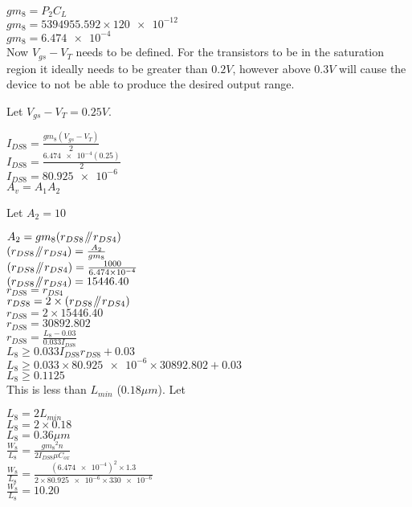$gm_{8} = P_{2}C_{L}$ \\
$gm_{8} = 5394955.592 \times \num{120e-12}$ \\
$gm_{8} = \num{6.474e-4}$ \\

Now $V_{gs} - V_{T}$ needs to be defined.
For the transistors to be in the saturation region it ideally needs to be greater than $0.2V$, however above $0.3V$ will cause the device to not be able to produce the desired output range.

Let $V_{gs} - V_{T} = 0.25V$.

$I_{DS8} = \frac{gm_{8}(V_{gs} - V_{T})}{2}$ \\
$I_{DS8} = \frac{\num{6.474e-4}(0.25)}{2}$ \\
$I_{DS8} = \num{80.925e-6}$ \\

$A_{v} = A_{1}A_{2}$

Let $A_{2} = 10$

$A_{2} = gm_{8}(r_{DS8} \mathbin{\!/\mkern-5mu/\!} r_{DS4})$ \\
$(r_{DS8} \mathbin{\!/\mkern-5mu/\!} r_{DS4}) = \frac{A_{2}}{gm_{8}}$ \\
$(r_{DS8} \mathbin{\!/\mkern-5mu/\!} r_{DS4}) = \frac{1000}{\num{6.474e-4}}$ \\
$(r_{DS8} \mathbin{\!/\mkern-5mu/\!} r_{DS4}) = 15446.40$ \\
$r_{DS8} = r_{DS4}$ \\
$r_{DS8} = 2 \times (r_{DS8} \mathbin{\!/\mkern-5mu/\!} r_{DS4})$ \\
$r_{DS8} = 2 \times 15446.40$ \\
$r_{DS8} = 30892.802$ \\

$r_{DS8} = \frac{L_{8} - 0.03}{0.033I_{DS8}}$ \\
$L_{8} \ge 0.033I_{DS8}r_{DS8} + 0.03$ \\
$L_{8} \ge 0.033 \times \num{80.925e-6} \times 30892.802 + 0.03$ \\
$L_{8} \ge 0.1125$ \\

This is less than $L_{min}$ ($0.18\mu m$).
Let

$L_{8} = 2L_{min}$ 	\\
$L_{8} = 2 \times 0.18$ \\
$L_{8} = 0.36\mu m$ \\

$\frac{W_{8}}{L_{8}} = \frac{{gm_{8}}^{2}n}{2I_{DS8}\mu C_{ox}}$ \\
$\frac{W_{8}}{L_{8}} = \frac{(\num{6.474e-4})^{2} \times 1.3}{2 \times \num{80.925e-6} \times \num{330e-6}}$ \\
$\frac{W_{8}}{L_{8}} = 10.20$ \\

